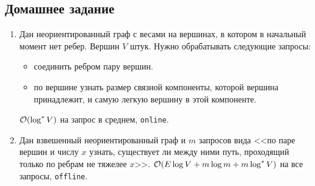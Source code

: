 \subsection{Домашнее задание}
\begin{enumerate}

  \item
    Дан неориентированный граф с весами на вершинах, в котором в начальный момент нет ребер.
    Вершин $V$ штук. Нужно обрабатывать следующие запросы:
    \begin{itemize}
      \item соединить ребром пару вершин.
      \item по вершине узнать размер связной компоненты, которой вершина принадлежит, и самую
            легкую вершину в этой компоненте.
    \end{itemize}
    $\mathcal{O}(\log^* V)$ на запрос в среднем, \texttt{online}.

  \item
    Дан взвешенный неориентированный граф и $m$ запросов вида <<по паре вершин и числу $x$ узнать,
    существует ли между ними путь, проходящий только по ребрам не тяжелее $x$>>.
    $\mathcal{O}(E \log V + m \log m + m \log^* V)$ на все запросы,  \texttt{offline}.
	

\end{enumerate}
